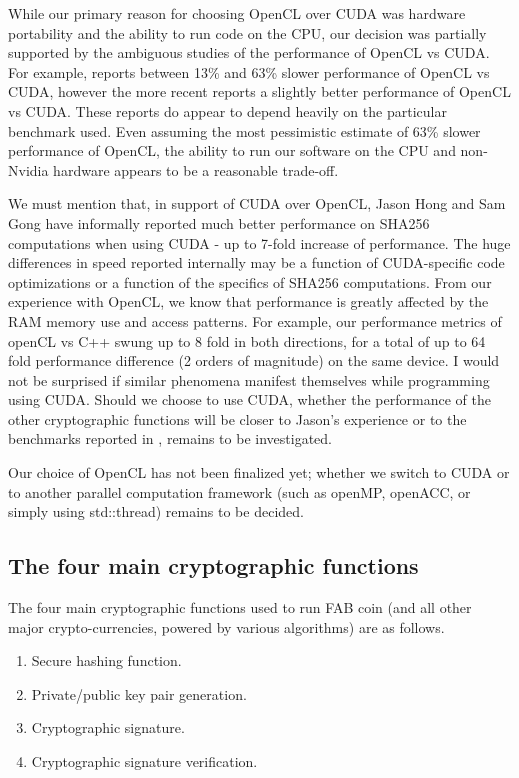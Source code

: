 \documentclass{article}
\begin{document}
While our primary reason for choosing OpenCL over CUDA was hardware portability and the ability to run code on the CPU, our decision was partially supported by the ambiguous studies of the performance of OpenCL vs CUDA. For example, \cite{KarimiEtAl:DBLP:CUDAvsOpenCL} reports between 13\% and 63\% slower performance of OpenCL vs CUDA, however the more recent \cite{MemetiLPKK17:CUDAvsOpenCL:DBLP:journals/corr} reports a slightly better performance of OpenCL vs CUDA. These reports do appear to depend heavily on the particular benchmark used. Even assuming the most pessimistic estimate of 63\% slower performance of OpenCL, the ability to run our software on the CPU and non-Nvidia hardware appears to be a reasonable trade-off. 

We must mention that, in support of CUDA over OpenCL, Jason Hong and Sam Gong have informally reported much better performance on SHA256 computations when using CUDA - up to 7-fold increase of performance. The huge differences in speed reported internally may be a function of CUDA-specific code optimizations or a function of the specifics of SHA256 computations. From our experience with OpenCL, we know that performance is greatly affected by the RAM memory use and access patterns. For example, our performance metrics of openCL vs C++ swung up to 8 fold in both directions, for a total of up to 64 fold performance difference (2 orders of magnitude) on the same device. I would not be surprised if similar phenomena manifest themselves while programming using CUDA.  Should we choose to use CUDA, whether the performance of the other cryptographic functions will be closer to Jason's experience or to the benchmarks reported in \cite{KarimiEtAl:DBLP:CUDAvsOpenCL}, \cite{MemetiLPKK17:CUDAvsOpenCL:DBLP:journals/corr} remains to be investigated.



Our choice of OpenCL has not been finalized yet; whether we switch to CUDA or to another parallel computation framework (such as openMP, openACC, or simply using std::thread) remains to be decided.


\subsection{The four main cryptographic functions} \label{sectionFourMainCrypto}
The four main cryptographic functions used to run FAB coin (and all other major crypto-currencies, powered by various algorithms) are as follows.
\begin{enumerate}
	\item \label{enumFourMainSHA} Secure hashing function.
	\item \label{enumFourMainPrivatePublicKeyGeneration} Private/public key pair generation.
	\item \label{enumFourMainCryptoSignature} Cryptographic signature.
	\item \label{enumFourMainVerification} Cryptographic signature verification.
\end{enumerate}
\end{document}
